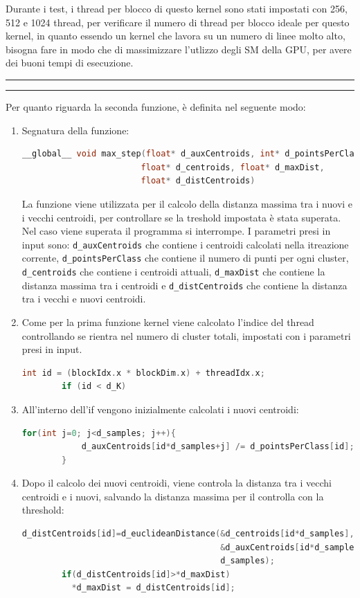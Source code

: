 \documentclass{article}
\begin{document}
  Durante i test, i thread per blocco di questo kernel sono stati impostati con 256, 512 e 1024 thread, per verificare il numero di thread per blocco ideale per questo kernel, in quanto essendo un kernel che lavora su un numero di linee molto alto, 
  bisogna fare in modo che di massimizzare l'utlizzo degli SM della GPU, per avere dei buoni tempi di esecuzione.
  \begin{center}
    \rule{2.5cm}{1pt}  \rule{2.5cm}{1pt}
  \end{center}
  Per quanto riguarda la seconda funzione, è definita nel seguente modo:
  \begin{enumerate}
    \item Segnatura della funzione:
      \begin{lstlisting}[language=C, xleftmargin=-5em]
        __global__ void max_step(float* d_auxCentroids, int* d_pointsPerClass, 
                        float* d_centroids, float* d_maxDist,
                        float* d_distCentroids)
      \end{lstlisting}
      La funzione viene utilizzata per il calcolo della distanza massima tra i nuovi e i vecchi centroidi, per controllare se la treshold impostata è stata superata. Nel caso viene superata il programma 
      si interrompe. I parametri presi in input sono: \verb|d_auxCentroids| che contiene i centroidi calcolati nella itreazione corrente, \verb|d_pointsPerClass| che contiene il numero di punti per ogni cluster, 
      \verb|d_centroids| che contiene i centroidi attuali, \verb|d_maxDist| che contiene la distanza massima tra i centroidi e \verb|d_distCentroids| che contiene la distanza tra i vecchi e nuovi centroidi.
    \item Come per la prima funzione kernel viene calcolato l'indice del thread controllando se rientra nel numero di cluster totali, impostati con i parametri presi in input.
      \begin{lstlisting}[language=C, xleftmargin=-5em]
        int id = (blockIdx.x * blockDim.x) + threadIdx.x;
        if (id < d_K)
      \end{lstlisting}
    \item All'interno dell'if vengono inizialmente calcolati i nuovi centroidi:
      \begin{lstlisting}[language=C, xleftmargin=-5em]
        for(int j=0; j<d_samples; j++){
            d_auxCentroids[id*d_samples+j] /= d_pointsPerClass[id];
        }
      \end{lstlisting}
    \item Dopo il calcolo dei nuovi centroidi, viene controla la distanza tra i vecchi centroidi e i nuovi, salvando la distanza massima per il controlla con la threshold:
      \begin{lstlisting}[language=C, xleftmargin=-5em]
        d_distCentroids[id]=d_euclideanDistance(&d_centroids[id*d_samples], 
                                        &d_auxCentroids[id*d_samples], 
                                        d_samples);
        if(d_distCentroids[id]>*d_maxDist)
          *d_maxDist = d_distCentroids[id];
      \end{lstlisting}
  \end{enumerate}
\end{document}
